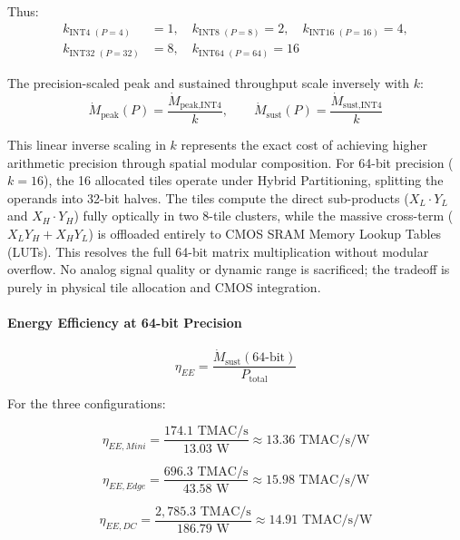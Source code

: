 \documentclass[journal]{IEEEtran}
\begin{document}
Thus:
\[
\begin{aligned}
k_{\text{INT4 }(P=4)} &= 1, \quad
k_{\text{INT8 }(P=8)} = 2, \quad
k_{\text{INT16 }(P=16)} = 4,\\
k_{\text{INT32 }(P=32)} &= 8, \quad
k_{\text{INT64 }(P=64)} = 16
\end{aligned}
\]

The precision-scaled peak and sustained throughput scale inversely with $k$:
\begin{equation}
\dot{M}_{\text{peak}}(P) = \frac{\dot{M}_{\text{peak,INT4}}}{k}, \qquad \dot{M}_{\text{sust}}(P) = \frac{\dot{M}_{\text{sust,INT4}}}{k}
\end{equation}

This linear inverse scaling in $k$ represents the exact cost of achieving higher arithmetic precision through spatial modular composition. For 64-bit precision ($k=16$), the 16 allocated tiles operate under Hybrid Partitioning, splitting the operands into 32-bit halves. The tiles compute the direct sub-products ($X_L \cdot Y_L$ and $X_H \cdot Y_H$) fully optically in two 8-tile clusters, while the massive cross-term ($X_L Y_H + X_H Y_L$) is offloaded entirely to CMOS SRAM Memory Lookup Tables (LUTs). This resolves the full 64-bit matrix multiplication without modular overflow. No analog signal quality or dynamic range is sacrificed; the tradeoff is purely in physical tile allocation and CMOS integration.

\paragraph{\textbf{Energy Efficiency at 64-bit Precision}}

\begin{equation}
\eta_{EE} = \frac{\dot{M}_{\text{sust}}(64\text{-bit})}{P_{\text{total}}}
\end{equation}

For the three configurations:

\begin{equation}
\eta_{EE,Mini} = \frac{174.1\text{ TMAC/s}}{13.03\text{ W}} \approx 13.36\text{ TMAC/s/W}
\end{equation}

\begin{equation}
\eta_{EE,Edge} = \frac{696.3\text{ TMAC/s}}{43.58\text{ W}} \approx 15.98\text{ TMAC/s/W}
\end{equation}

\begin{equation}
\eta_{EE,DC} = \frac{2,785.3\text{ TMAC/s}}{186.79\text{ W}} \approx 14.91\text{ TMAC/s/W}
\end{equation}
\end{document}
